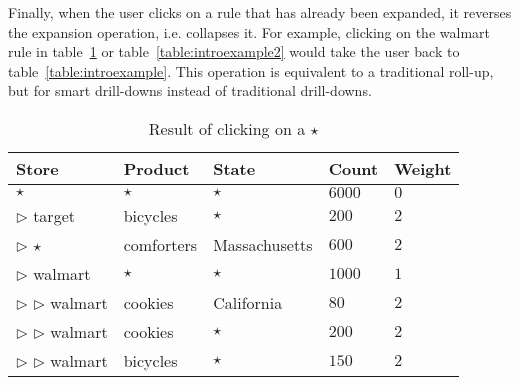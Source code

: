 Finally, when the user clicks on a rule that has already been expanded, it reverses the expansion operation, i.e. collapses it. For example, clicking on the walmart rule in table~\ref{table:introexample3} or table~\ref{table:introexample2} would take the user back to table~\ref{table:introexample}. This operation is equivalent to a traditional
roll-up, but for smart drill-downs instead of traditional drill-downs.
	
\begin{table}
\centering
\begin{tabular}{| l | l | l | l | l |}
\hline Store & Product & State & Count & Weight \\
\hline
$\star$ & $\star$ & $\star$ & $6000$ & $0$ \\ \cline{1-5}
$\triangleright$ target & bicycles & $\star$ & $200$ & $2$ \\ \cline{1-5}
$\triangleright$ $\star$ & comforters & Massachusetts & $600$ & $2$ \\ \cline{1-5}
$\triangleright$ walmart & $\star$ & $\star$ & $1000$ & $1$ \\ \cline{2-5}
$\triangleright$ $\triangleright$ walmart & cookies & California & $80$ & $2$ \\ \cline{2-5}
$\triangleright$ $\triangleright$ walmart & cookies & $\star$ & $200$ & $2$ \\ \cline{2-5}
$\triangleright$ $\triangleright$ walmart & bicycles & $\star$ & $150$ & $2$ \\  \hline
\end{tabular}
\vspace{-15pt}
\caption{Result of clicking on a $\star$ \label{table:introexample3}}
\end{table}

